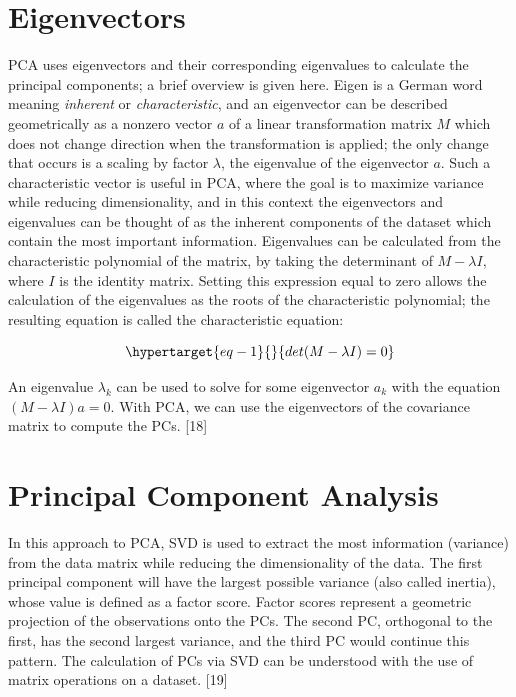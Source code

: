 \documentclass[
  letterpaper,
  DIV=11,
  numbers=noendperiod]{scrreprt}
\begin{document}
\hypertarget{eigenvectors}{%
\section{Eigenvectors}\label{eigenvectors}}

PCA uses eigenvectors and their corresponding eigenvalues to calculate
the principal components; a brief overview is given here. Eigen is a
German word meaning \emph{inherent} or \emph{characteristic}, and an
eigenvector can be described geometrically as a nonzero vector \(a\) of
a linear transformation matrix \(M\) which does not change direction
when the transformation is applied; the only change that occurs is a
scaling by factor \(\lambda\), the eigenvalue of the eigenvector \(a\).
Such a characteristic vector is useful in PCA, where the goal is to
maximize variance while reducing dimensionality, and in this context the
eigenvectors and eigenvalues can be thought of as the inherent
components of the dataset which contain the most important information.
Eigenvalues can be calculated from the characteristic polynomial of the
matrix, by taking the determinant of \(M - \lambda I\), where \(I\) is
the identity matrix. Setting this expression equal to zero allows the
calculation of the eigenvalues as the roots of the characteristic
polynomial; the resulting equation is called the characteristic
equation:

\begin{equation}\protect\hypertarget{eq-1}{}{
det(M - \lambda I) = 0
}\label{eq-1}\end{equation}

An eigenvalue \(\lambda_k\) can be used to solve for some eigenvector
\(a_k\) with the equation \((M - \lambda I)a = 0\). With PCA, we can use
the eigenvectors of the covariance matrix to compute the PCs. {[}18{]}

\hypertarget{principal-component-analysis}{%
\section{Principal Component
Analysis}\label{principal-component-analysis}}

In this approach to PCA, SVD is used to extract the most information
(variance) from the data matrix while reducing the dimensionality of the
data. The first principal component will have the largest possible
variance (also called inertia), whose value is defined as a factor
score. Factor scores represent a geometric projection of the
observations onto the PCs. The second PC, orthogonal to the first, has
the second largest variance, and the third PC would continue this
pattern. The calculation of PCs via SVD can be understood with the use
of matrix operations on a dataset. {[}19{]}
\end{document}
